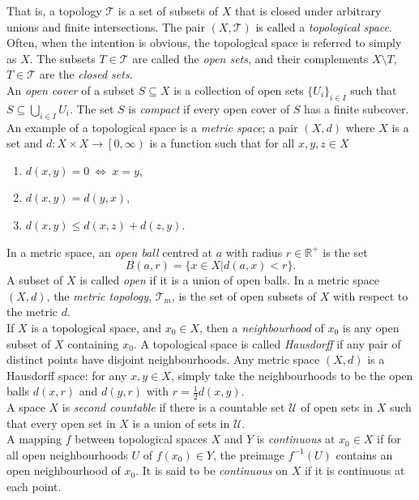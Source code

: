 That is, a topology $\mathscr{T}$ is a set of subsets of $X$ that is closed under arbitrary unions and finite intersections. The pair $(X,\mathscr{T})$ is called a \textit{topological space}. Often, when the intention is obvious, the topological space is referred to simply as $X$. The subsets $T \in \mathscr{T}$ are called the \textit{open sets}, and their complements $X \setminus T$, $T \in \mathscr{T}$ are the \textit{closed sets}. \\

An \textit{open cover} of a subset $S\subseteq X$ is a collection of open sets $\{U_i\}_{i\in I}$ such that $S\subseteq\bigcup_{i\in I}U_i$. The set $S$ is \textit{compact} if every open cover of $S$ has a finite subcover.\\

An example of a topological space is a \textit{metric space}; a pair $(X,d)$ where $X$ is a set and $d:X \times X \rightarrow \left[ 0, \infty \right)$ is a function such that for all $x,y,z \in X$
\begin{enumerate}
	\item $d(x,y)=0 \: \Leftrightarrow \: x=y$,
	\item $d(x,y)=d(y,x)$,
	\item $d(x,y)\leq	d(x,z) + d(z,y)$.
\end{enumerate}
In a metric space, an \textit{open ball} centred at $a$ with radius $r\in \mathbb{R}^+$ is the set  $$B(a,r)=\{ x\in X | d(a,x)<r \}.$$ A subset of $X$ is called \textit{open} if it is a union of open balls. In a metric space $(X,d)$, the \textit{metric topology}, $\mathscr{T}_m$, is the set of open subsets of $X$ with respect to the metric $d$.\\

If $X$ is a topological space, and $x_0 \in X$, then a \textit{neighbourhood} of
$x_0$ is any open subset of $X$ containing $x_0$. A topological space is called
\textit{Hausdorff} if any pair of distinct points have disjoint neighbourhoods.
Any metric space $(X,d)$ is a Hausdorff space: for any $x,y \in X$, simply take
the neighbourhoods to be the open balls $d(x,r)$ and $d(y,r)$ with
$r=\frac{1}{2}d(x,y)$. \\

A space $X$ is \textit{second countable} if there is a countable set
$\mathcal{U}$ of open sets in $X$ such that every open set in $X$ is a union of
sets in $\mathcal{U}$.\\

A mapping $f$ between topological spaces $X$ and $Y$ is \textit{continuous} at
$x_0 \in X$ if for all open neighbourhoods $U$ of $f(x_0)\in Y$, the preimage
$f^{-1}(U)$ contains an open neighbourhood of $x_0$. It is said to be
\textit{continuous} on $X$ if it is continuous at each point.\\

